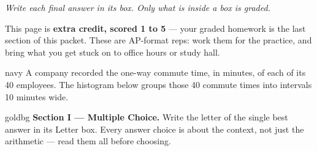 \documentclass[12pt]{article}
\begin{document}
{\small\itshape Write each final answer in its box. Only what is inside a box is graded.}\par

\vspace{0.08in}

\boxguard[8]
\begin{remindbox}
\small
This page is \textbf{extra credit, scored 1 to 5} --- your graded homework is the last section
of this packet. These are AP-format reps: work them for the practice, and bring what you get
stuck on to office hours or study hall.
\end{remindbox}

\vspace{0.12in}

\boxguard[24]
\begin{scenariobox}{navy}
\small
A company recorded the one-way commute time, in minutes, of each of its 40 employees. The
histogram below groups those 40 commute times into intervals 10 minutes wide.

\vspace{6pt}
\begin{center}
\end{center}
\end{scenariobox}

\vspace{0.10in}

\boxguard[16]
\begin{headlinebox}{goldbg}
\small
\textbf{Section I --- Multiple Choice.} Write the letter of the single best answer in its Letter box. Every answer choice is
about the context, not just the arithmetic --- read them all before choosing.
\end{headlinebox}
\end{document}
